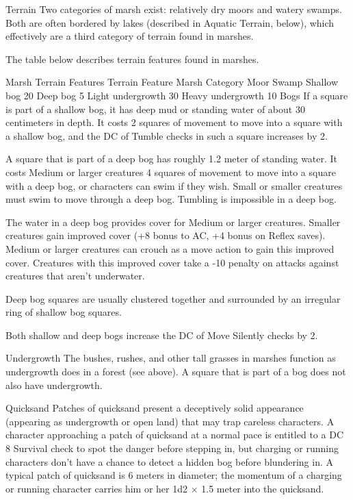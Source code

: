 \Marsh Terrain
Two categories of marsh exist: relatively dry moors and watery swamps. Both are often bordered by lakes (described in Aquatic Terrain, below), which effectively are a third category of terrain found in marshes.

The table below describes terrain features found in marshes.

Marsh Terrain Features
Terrain Feature	Marsh Category
Moor	Swamp
Shallow bog	20%
Deep bog	5%
Light undergrowth	30%
Heavy undergrowth	10%
Bogs
If a square is part of a shallow bog, it has deep mud or standing water of about 30 centimeters in depth. It costs 2 squares of movement to move into a square with a shallow bog, and the DC of Tumble checks in such a square increases by 2.

A square that is part of a deep bog has roughly 1.2 meter of standing water. It costs Medium or larger creatures 4 squares of movement to move into a square with a deep bog, or characters can swim if they wish. Small or smaller creatures must swim to move through a deep bog. Tumbling is impossible in a deep bog.

The water in a deep bog provides cover for Medium or larger creatures. Smaller creatures gain improved cover (+8 bonus to AC, +4 bonus on Reflex saves). Medium or larger creatures can crouch as a move action to gain this improved cover. Creatures with this improved cover take a -10 penalty on attacks against creatures that aren’t underwater.

Deep bog squares are usually clustered together and surrounded by an irregular ring of shallow bog squares.

Both shallow and deep bogs increase the DC of Move Silently checks by 2.

Undergrowth
The bushes, rushes, and other tall grasses in marshes function as undergrowth does in a forest (see above). A square that is part of a bog does not also have undergrowth.

Quicksand
Patches of quicksand present a deceptively solid appearance (appearing as undergrowth or open land) that may trap careless characters. A character approaching a patch of quicksand at a normal pace is entitled to a DC 8 Survival check to spot the danger before stepping in, but charging or running characters don’t have a chance to detect a hidden bog before blundering in. A typical patch of quicksand is 6 meters in diameter; the momentum of a charging or running character carries him or her 1d2 $\times$ 1.5 meter into the quicksand.

